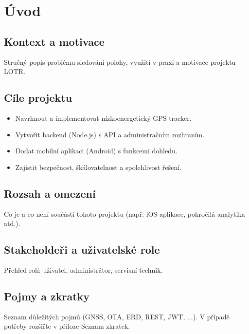 \chapter{Úvod}
\label{chap:uvod}

\section{Kontext a motivace}
Stručný popis problému sledování polohy, využití v praxi a motivace projektu LOTR.

\section{Cíle projektu}
\begin{itemize}
  \item Navrhnout a implementovat nízkoenergetický GPS tracker.
  \item Vytvořit backend (Node.js) s API a administračním rozhraním.
  \item Dodat mobilní aplikaci (Android) s funkcemi dohledu.
  \item Zajistit bezpečnost, škálovatelnost a spolehlivost řešení.
\end{itemize}

\section{Rozsah a omezení}
Co je a co není součástí tohoto projektu (např. iOS aplikace, pokročilá analytika atd.).

\section{Stakeholdeři a uživatelské role}
Přehled rolí: uživatel, administrátor, servisní technik.

\section{Pojmy a zkratky}
Seznam důležitých pojmů (GNSS, OTA, ERD, REST, JWT, ...). V případě potřeby rozšiřte v příloze Seznam zkratek.
